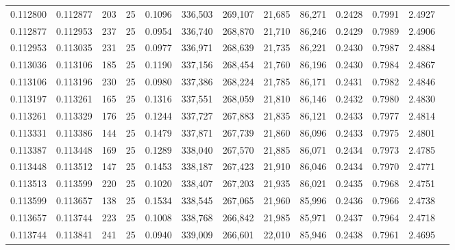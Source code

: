 \begin{tabular}{rrrrrrrrrrrrr}
0.112800 & 0.112877 &   203 &  25 &                                     0.1096 & 336,503 & 269,107 &  21,685 &  86,271 & 0.2428 & 0.7991 & 2.4927 \\
0.112877 & 0.112953 &   237 &  25 &                                     0.0954 & 336,740 & 268,870 &  21,710 &  86,246 & 0.2429 & 0.7989 & 2.4906 \\
0.112953 & 0.113035 &   231 &  25 &                                     0.0977 & 336,971 & 268,639 &  21,735 &  86,221 & 0.2430 & 0.7987 & 2.4884 \\
0.113036 & 0.113106 &   185 &  25 &                                     0.1190 & 337,156 & 268,454 &  21,760 &  86,196 & 0.2430 & 0.7984 & 2.4867 \\
0.113106 & 0.113196 &   230 &  25 &                                     0.0980 & 337,386 & 268,224 &  21,785 &  86,171 & 0.2431 & 0.7982 & 2.4846 \\
0.113197 & 0.113261 &   165 &  25 &                                     0.1316 & 337,551 & 268,059 &  21,810 &  86,146 & 0.2432 & 0.7980 & 2.4830 \\
0.113261 & 0.113329 &   176 &  25 &                                     0.1244 & 337,727 & 267,883 &  21,835 &  86,121 & 0.2433 & 0.7977 & 2.4814 \\
0.113331 & 0.113386 &   144 &  25 &                                     0.1479 & 337,871 & 267,739 &  21,860 &  86,096 & 0.2433 & 0.7975 & 2.4801 \\
0.113387 & 0.113448 &   169 &  25 &                                     0.1289 & 338,040 & 267,570 &  21,885 &  86,071 & 0.2434 & 0.7973 & 2.4785 \\
0.113448 & 0.113512 &   147 &  25 &                                     0.1453 & 338,187 & 267,423 &  21,910 &  86,046 & 0.2434 & 0.7970 & 2.4771 \\
0.113513 & 0.113599 &   220 &  25 &                                     0.1020 & 338,407 & 267,203 &  21,935 &  86,021 & 0.2435 & 0.7968 & 2.4751 \\
0.113599 & 0.113657 &   138 &  25 &                                     0.1534 & 338,545 & 267,065 &  21,960 &  85,996 & 0.2436 & 0.7966 & 2.4738 \\
0.113657 & 0.113744 &   223 &  25 &                                     0.1008 & 338,768 & 266,842 &  21,985 &  85,971 & 0.2437 & 0.7964 & 2.4718 \\
0.113744 & 0.113841 &   241 &  25 &                                     0.0940 & 339,009 & 266,601 &  22,010 &  85,946 & 0.2438 & 0.7961 & 2.4695 \\

\end{tabular}
